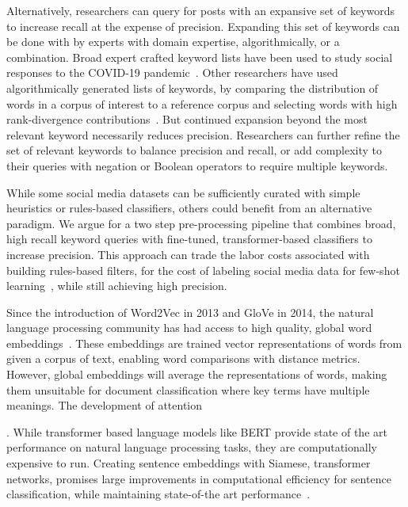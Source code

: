 Alternatively, researchers can query for posts with an expansive set of keywords
to increase recall at the expense of precision. 
Expanding this set of keywords can be done with by experts with domain expertise, algorithmically, or a combination.
Broad expert crafted keyword lists have been used to study
social responses to the COVID-19 pandemic~\cite{shugars2021pandemics,chen2020tracking,green2020elusive,twitter_2020}.
Other researchers have used algorithmically generated lists of keywords,
by comparing the distribution of words in a corpus of interest to a reference corpus and selecting words with high rank-divergence contributions~\cite{dodds2020allotaxonometry,alshaabi2021world,minot2022distinguishing,stupinski2022quantifying}. 
But continued expansion beyond the most relevant keyword necessarily reduces precision. 
Researchers can further refine the set of relevant keywords to balance precision and recall,
or add complexity to their queries with negation or Boolean operators to require multiple keywords.

While some social media datasets can be sufficiently curated
with simple heuristics
or rules-based classifiers,
others could benefit from an alternative paradigm.
We argue for a two step pre-processing pipeline
that combines broad,
high recall keyword queries
with fine-tuned,
transformer-based classifiers
to increase precision.
This approach can trade the labor costs associated with building rules-based filters, 
for the cost of labeling social media data for few-shot learning~\cite{wang2020generalizing}, while still achieving high precision.

Since the introduction of Word2Vec in 2013 and GloVe in 2014,
the natural language processing community has had access to high quality, global word embeddings~\cite{mikolov2013efficient,pennington2014glove}.
These embeddings are trained vector representations of words from given a corpus of text,
enabling word comparisons with distance metrics.
However, global embeddings will average the representations of words,
making them unsuitable for document classification
where key terms have multiple meanings.
The development of attention  %

. 
While transformer based language models like BERT provide state of the art performance on natural language processing tasks, they are computationally expensive to run. Creating sentence embeddings with Siamese, transformer networks, promises large improvements in computational efficiency for sentence classification, while maintaining state-of-the art performance~\cite{reimers-2019-sentence-bert}.

